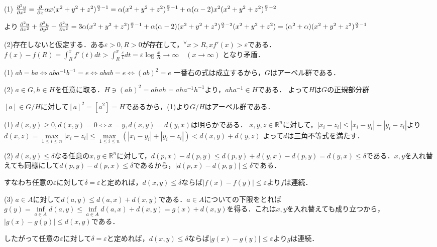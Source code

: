 \documentclass[
		book,
		head_space=20mm,
		foot_space=20mm,
		gutter=10mm,
		line_length=190mm
]{jlreq}
\begin{document}
(1) $\pdv[2]{u}{x} = \pdv{}{x}\alpha x(x^2+y^2+z^2)^{\frac{\alpha}{2}-1}=\alpha (x^2+y^2+z^2)^{\frac{\alpha}{2}-1}+\alpha(\alpha-2) x^2(x^2+y^2+z^2)^{\frac{\alpha}{2}-2}$

より$\pdv[2]{u}{x}+ \pdv[2]{u}{y}+\pdv[2]{u}{z} = 3\alpha (x^2+y^2+z^2)^{\frac{\alpha}{2}-1} + \alpha
(\alpha-2) (x^2+y^2+z^2)^{\frac{\alpha}{2}-2} (x^2+y^2+z^2)= (\alpha^2+\alpha)(x^2+ y^2+z^2)^{\frac{\alpha}{2}-1} $

(2)存在しないと仮定する．ある$\varepsilon>0,R>0$が存在して，${}^\forall x >R,xf'(x)>\varepsilon$である．
$f(x)-f(R)=\int_R^{x}f'(t)dt > \int_R^{x}\frac{\varepsilon}{t}dt = \varepsilon \log \frac{x}{R} \to \infty \quad(x \to \infty)$ となり矛盾．


(1) $ab=ba \Leftrightarrow aba^{-1}b^{-1}=e\Leftrightarrow abab=e\Leftrightarrow(ab)^2=e$
一番右の式は成立するから，$G$はアーベル群である．

(2) $a\in G, h\in H$を任意に取る．$H \ni (ah)^2=ahah=aha^{-1}h^{-1}$より，$aha^{-1} \in H$である．
よって$H$は$G$の正規部分群

$[a]\in G/H$に対して$[a]^2=[a^2]=H$であるから，(1)より$G/H$はアーベル群である．

(1) $d(x,y)\ge 0,d(x,y)=0 \Leftrightarrow x=y,d(x,y)=d(y,x)$は明らかである．
$x,y,z \in \mathbb{R}^n$に対して，$|x_i-z_i| \le |x_i-y_i|+|y_i-z_i|$より$d(x,z)=\max\limits_{1\le i \le n}|x_i-z_i| \le \max\limits_{1\le i \le n}(|x_i-y_i|+|y_i-z_i|)<d(x,y)+d(y,z)$
よって$d$は三角不等式を満たす．

(2) $d(x,y) \le \delta$なる任意の$x,y \in \mathbb{R}^n$に対して，$d(p,x) - d(p,y) \le d(p,y)+d(y,x)-d(p,y)=d(y,x) \le \delta$である．$x,y$を入れ替えても同様にして$d(p,y)-d(p,x) \le \delta$であるから，$|d(p,x)-d(p,y)| \le \delta$である．

すなわち任意の$\varepsilon$に対して$\delta=\varepsilon$と定めれば，$d(x,y) \le \delta$ならば$|f(x)-f(y)| \le \varepsilon$より$f$は連続．

(3) $a\in A$に対して$d(a,y) \le d(a,x)+d(x,y)$である．$a\in A$についての下限をとれば$g(y)=\inf\limits_{a\in A}d(a,y) \le \inf\limits_{a\in A}d(a,x)+d(x,y)=g(x)+d(x,y)$を得る．これは$x,y$を入れ替えても成り立つから，$|g(x)-g(y)| \le d(x,y)$である．

したがって任意の$\varepsilon$に対して$\delta=\varepsilon$と定めれば，$d(x,y) \le \delta$ならば$|g(x)-g(y)| \le \varepsilon$より$g$は連続．
\end{document}
